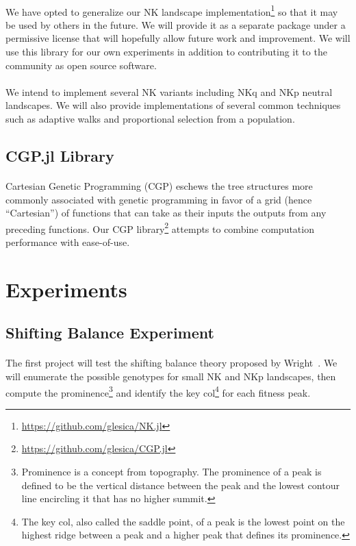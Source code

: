 \documentclass[12pt,letterpaper,titlepage]{article}
\begin{document}
\paragraph{}
We have opted to generalize our NK landscape
implementation\footnote{\url{https://github.com/glesica/NK.jl}} so that it may
be used by others in the future. We will provide it as a separate package under
a permissive license that will hopefully allow future work and improvement.  We
will use this library for our own experiments in addition to contributing it to
the community as open source software.

\paragraph{}
We intend to implement several NK variants including NKq and NKp neutral
landscapes. We will also provide implementations of several common techniques
such as adaptive walks and proportional selection from a population.

\subsection{CGP.jl Library}

\paragraph{}
Cartesian Genetic Programming (CGP) eschews the tree structures more commonly
associated with genetic programming in favor of a grid (hence ``Cartesian'') of
functions that can take as their inputs the outputs from any preceding
functions. Our CGP library\footnote{\url{https://github.com/glesica/CGP.jl}}
attempts to combine computation performance with ease-of-use.

\section{Experiments}

\subsection{Shifting Balance Experiment}

\paragraph{}
The first project will test the shifting balance theory proposed by
Wright~\cite{Wright1982}\cite{Wright1931}. We will enumerate the possible
genotypes for small NK and NKp landscapes, then compute the
prominence\footnote{Prominence is a concept from topography. The prominence of
a peak is defined to be the vertical distance between the peak and the
lowest contour line encircling it that has no higher summit.} and identify the
key col\footnote{The key col, also called the saddle point, of a peak is the
lowest point on the highest ridge between a peak and a higher peak that
defines its prominence.} for each fitness peak.
\end{document}
